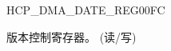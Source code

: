 \begin{register}{H}{CP\_DMA\_DATE\_REG}{\hexprefix{}00FC}\label{regdesc:CPDMADATEREG}
%
\regnewline%
\begin{regdesc}\begin{reglist}
\label{fielddesc:CPDMADMADATE}\item [CP\_DMA\_DMA\_DATE] 版本控制寄存器。 (读/写)
\end{reglist}\end{regdesc}
\end{register}



